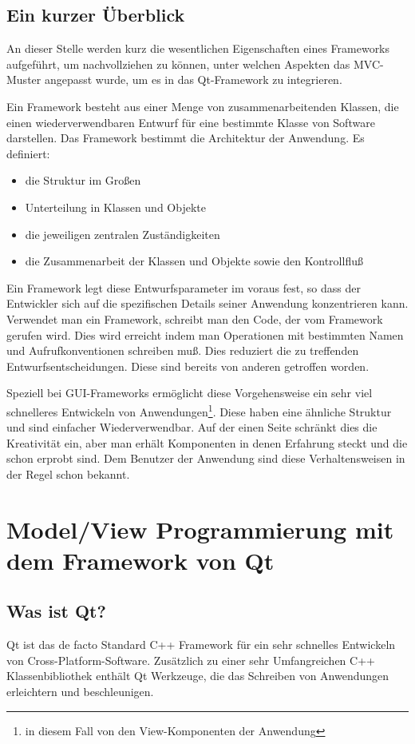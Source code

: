 \documentclass[11pt,a4paper,titlepage]{scrreprt}
\begin{document}
\section{Ein kurzer Überblick}
An dieser Stelle werden kurz die wesentlichen Eigenschaften eines Frameworks aufgeführt,
um nachvollziehen zu können, unter welchen Aspekten das MVC-Muster angepasst wurde, um es
in das Qt-Framework zu integrieren.{\medskip}

Ein Framework besteht aus einer Menge von zusammenarbeitenden Klassen, die einen
wiederverwendbaren Entwurf für eine bestimmte Klasse von Software darstellen. Das
Framework bestimmt die Architektur der Anwendung. Es definiert:

\begin{itemize}
\item die Struktur im Großen
\item Unterteilung in Klassen und Objekte
\item die jeweiligen zentralen Zuständigkeiten
\item die Zusammenarbeit der Klassen und Objekte sowie den Kontrollfluß
\end{itemize}

Ein Framework legt diese Entwurfsparameter im voraus fest, so dass der Entwickler
sich auf die spezifischen Details seiner Anwendung konzentrieren kann.
Verwendet man ein Framework, schreibt man den Code, der vom Framework gerufen wird.
Dies wird erreicht indem man Operationen mit bestimmten Namen und Aufrufkonventionen
schreiben muß. Dies reduziert die zu treffenden Entwurfsentscheidungen. Diese sind
bereits von anderen getroffen worden.

Speziell bei GUI-Frameworks ermöglicht diese Vorgehensweise ein sehr viel schnelleres
Entwickeln von Anwendungen\footnote{in diesem Fall von den View-Komponenten
der Anwendung}. Diese haben eine ähnliche Struktur und sind einfacher Wiederverwendbar.
Auf der einen Seite schränkt dies die Kreativität ein, aber man erhält Komponenten 
in denen Erfahrung steckt und die schon erprobt sind. Dem Benutzer der Anwendung sind
diese Verhaltensweisen in der Regel schon bekannt.

\chapter{Model/View Programmierung mit dem Framework von Qt}
\section{Was ist Qt?}
Qt ist das de facto Standard C++ Framework für ein sehr schnelles Entwickeln von
Cross-Platform-Software. Zusätzlich zu einer sehr Umfangreichen C++ Klassenbibliothek
enthält Qt Werkzeuge, die das Schreiben von Anwendungen erleichtern und
beschleunigen.
\end{document}
